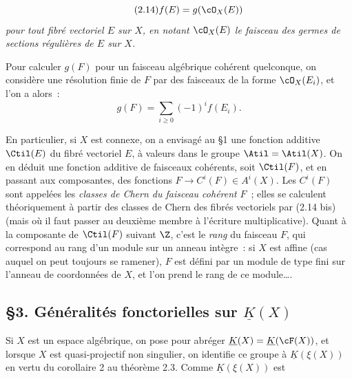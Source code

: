 \begin{equation}\tag{2.14}
 f(E)=g(\cO_X(E))
\end{equation}
\emph{pour tout fibré vectoriel $E$ sur $X$, en notant $\cO_X(E)$ le faisceau des germes de sections régulières de $E$ sur $X$.}

Pour calculer $g(F)$ pour un faisceau algébrique cohérent quelconque, on considère une résolution finie de $F$ par des faisceaux de la forme $\cO_X(E_i)$, et l'on a alors~:
\begin{equation}\tag{2.14 bis}
 g(F)=\sum_{i\geq0}(-1)^if(E_i).
\end{equation}

En particulier, si $X$ est connexe, on a envisagé au \S 1 une fonction additive $\Ctil(E)$ du fibré vectoriel $E$, à valeurs dans le groupe $\Atil=\Atil(X)$. On en déduit une fonction additive de faisceaux cohérents, soit $\Ctil(F)$, et en passant aux composantes, des fonctions $F\longrightarrow C^i(F)\in A^i(X)$. Les $C^i(F)$ sont appelées les \emph{classes de Chern du faisceau cohérent} $F$~; elles se calculent théoriquement à partir des classes de Chern des fibrés vectoriels par (2.14 bis) (mais où il faut passer au deuxième membre à l'écriture multiplicative). Quant à la composante de $\Ctil(F)$ suivant $\Z$, c'est le \emph{rang} du faisceau $F$, qui correspond au rang d'un module sur un anneau intègre~: si $X$ est affine (cas auquel on peut toujours se ramener), $F$ est défini par un module de type fini sur l'anneau de coordonnées de $X$, et l'on prend le rang de ce module\dots.

\subsection*{\S 3. Généralités fonctorielles sur $\underline{K}(X)$}

Si $X$ est un espace algébrique, on pose pour abréger $\underline{K}(X)=\underline{K}(\cF(X))$, et lorsque $X$ est quasi-projectif non singulier, on identifie ce groupe à $\underline{K}(\xi(X))$ en vertu du corollaire 2 au théorème 2.3. Comme $\underline{K}(\xi(X))$ est 
